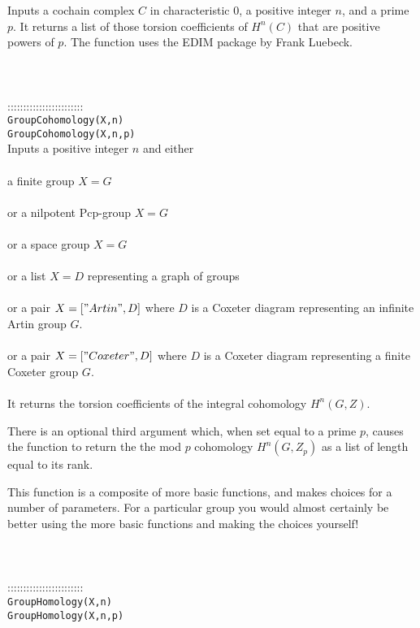 \documentclass[a4paper,11pt]{report}
\begin{document}
{ Inputs a cochain complex $C$ in characteristic 0, a positive integer $n$, and a prime $p$. It returns a list of those torsion coefficients of $H^n(C)$ that are positive powers of $p$. The function uses the EDIM package by Frank Luebeck. \\
 \\
 \\
 \\
 ::::::::::::::::::::::::\\
 \texttt{GroupCohomology(X,n) }\\
 \texttt{GroupCohomology(X,n,p)}\\
 

 Inputs a positive integer $n$ and either \\
 \\
 a finite group $X=G$ \\
 \\
 or a nilpotent Pcp-group $X=G$ \\
 \\
 or a space group $X=G$ \\
 \\
 or a list $X=D$ representing a graph of groups\\
 \\
or a pair $X=["Artin",D]$ where $D$ is a Coxeter diagram representing an infinite Artin group $G$.\\
 \\
or a pair $X=["Coxeter",D]$ where $D$ is a Coxeter diagram representing a finite Coxeter group $G$.\\
 \\
 It returns the torsion coefficients of the integral cohomology $H^n(G,Z)$. 

 There is an optional third argument which, when set equal to a prime $p$, causes the function to return the the mod $p$ cohomology $H^n(G,Z_p)$ as a list of length equal to its rank. 

 This function is a composite of more basic functions, and makes choices for a
number of parameters. For a particular group you would almost certainly be
better using the more basic functions and making the choices yourself! \\
 \\
 \\
 \\
 ::::::::::::::::::::::::\\
 \texttt{GroupHomology(X,n)}\\
 \texttt{GroupHomology(X,n,p)}\\
 

}
\end{document}
